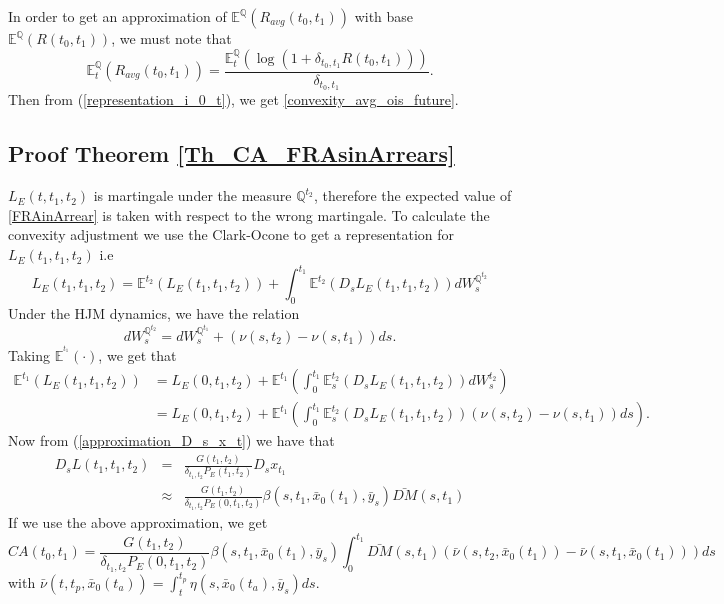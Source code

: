 \documentclass[a4paper,10pt]{article}
\newcommand{\1}{\mathbf{1}}
\begin{document}
In order to get an approximation of $\mathbb{E}^{\mathbb{Q}}\left(R_{avg}(t_0,t_1)\right)$ with base $\mathbb{E}^{\mathbb{Q}}\left(R(t_0,t_1)\right)$, we must note that 
\begin{equation*}
\mathbb{E}_t^{\mathbb{Q}}\left(R_{avg}(t_0,t_1)\right) = \frac{\mathbb{E}_t^{\mathbb{Q}}\left( \log(1+ \delta_{t_0,t_1} R(t_0,t_1))\right)}{ \delta_{t_0,t_1}}.
\end{equation*}
Then from (\ref{representation_i_0_t}), we get \eqref{convexity_avg_ois_future}.

\subsection{Proof Theorem \ref{Th_CA_FRAsinArrears}}\label{Proof_CA_FRAsinArrears}
$L_{E}(t,t_1,t_2)$ is martingale under the measure $\mathbb{Q}^{t_2}$, therefore the expected value of \eqref{FRAinArrear} is taken with respect to the wrong martingale. To calculate the convexity adjustment we use the Clark-Ocone to get a representation for $L_{E}(t_1,t_1,t_2)$ i.e
\begin{equation}\label{general_convexity_fras}
L_{E}(t_1,t_1,t_2) = \mathbb{E}^{t_2}\left(L_{E}(t_1,t_1,t_2) \right) + \int_{0}^{t_1} \mathbb{E}^{t_2}\left(D_s L_{E}(t_1,t_1,t_2) \right) dW^{\mathbb{Q}^{t_2}}_{s}
\end{equation}
Under the HJM dynamics, we have the relation
\begin{equation*}
dW^{\mathbb{Q}^{t_2}}_s = dW^{\mathbb{Q}^{t_1}}_s + (\nu(s,t_2) - \nu(s,t_1)) ds. 
\end{equation*}
Taking $\mathbb{E}^{^{t_1}}(\cdot)$, we get that
\begin{align*}
\mathbb{E}^{t_1}\left(L_{E}(t_1,t_1,t_2) \right) &= L_{E}(0,t_1,t_2) + \mathbb{E}^{t_1}\left( \int_{0}^{t_1} \mathbb{E}_s^{t_2}\left(D_s L_{E}(t_1,t_1,t_2) \right) dW^{t_2}_{s}\right)\\
&= L_{E}(0,t_1,t_2) + \mathbb{E}^{t_1}\left( \int_{0}^{t_1} \mathbb{E}_s^{t_2}\left(D_s L_{E}(t_1,t_1,t_2) \right) (\nu(s,t_2)-\nu(s,t_1)) ds \right).
\end{align*}
Now from (\ref{approximation_D_s_x_t}) we have that 
\begin{eqnarray*}
D_s L(t_1,t_1,t_2) &=& \frac{G(t_1,t_2)}{\delta_{t_1,t_2}P_{E}(t_1,t_2)} D_s x_{t_1}\\
&\approx& \frac{G(t_1,t_2)}{\delta_{t_1,t_2}P_{E}(0,t_1,t_2)} \beta(s,t_1, \bar{x}_0(t_1), \bar{y}_s)\bar{DM}(s,t_1)
\end{eqnarray*}
If we use the above approximation, we get
\begin{equation*}
CA(t_0,t_1) = \frac{G(t_1,t_2)}{\delta_{t_1,t_2}P_{E}(0,t_1,t_2)} \beta(s,t_1, \bar{x}_0(t_1), \bar{y}_s) \int_{0}^{t_1} \bar{DM}(s,t_1) (\bar{\nu}(s,t_2,\bar{x}_{0}(t_1))-\bar{\nu}(s,t_1,\bar{x}_{0}(t_1))) ds
\end{equation*}
with $\bar{\nu}(t,t_p, \bar{x}_0(t_a))= \int_{t}^{t_p} \eta(s,\bar{x}_0(t_a),\bar{y}_s) ds$.   
\end{document}
